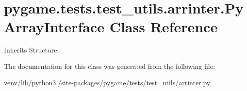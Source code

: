 \hypertarget{classpygame_1_1tests_1_1test__utils_1_1arrinter_1_1_py_array_interface}{}\section{pygame.\+tests.\+test\+\_\+utils.\+arrinter.\+Py\+Array\+Interface Class Reference}
\label{classpygame_1_1tests_1_1test__utils_1_1arrinter_1_1_py_array_interface}


Inherits Structure.



The documentation for this class was generated from the following file\+:\begin{DoxyCompactItemize}
\item 
venv/lib/python3./site-\/packages/pygame/tests/test\+\_\+utils/arrinter.\+py\end{DoxyCompactItemize}
